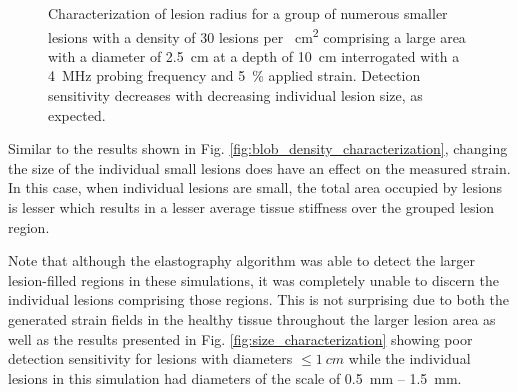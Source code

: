 			\begin{figure}[!t]
				\centering
				\caption[Clustered lesion radius characterization]{Characterization of lesion radius for a group of numerous smaller lesions with a density of 30 lesions per \SI{}{cm^2} comprising a large area with a diameter of \SI{2.5}{cm} at a depth of \SI{10}{cm} interrogated with a \SI{4}{MHz} probing frequency and \SI{5}{\percent} applied strain. Detection sensitivity decreases with decreasing individual lesion size, as expected.}
				\label{fig:blob_radius_characterization}
			\end{figure}

			Similar to the results shown in Fig. \ref{fig:blob_density_characterization}, changing the size of the individual small lesions does have an effect on the measured strain. In this case, when individual lesions are small, the total area occupied by lesions is lesser which results in a lesser average tissue stiffness over the grouped lesion region.

			Note that although the elastography algorithm was able to detect the larger lesion-filled regions in these simulations, it was completely unable to discern the individual lesions comprising those regions. This is not surprising due to both the generated strain fields in the healthy tissue throughout the larger lesion area as well as the results presented in Fig. \ref{fig:size_characterization} showing poor detection sensitivity for lesions with diameters $\leq \SI{1}{cm}$ while the individual lesions in this simulation had diameters of the scale of \SI{0.5}{mm} -- \SI{1.5}{mm}.


